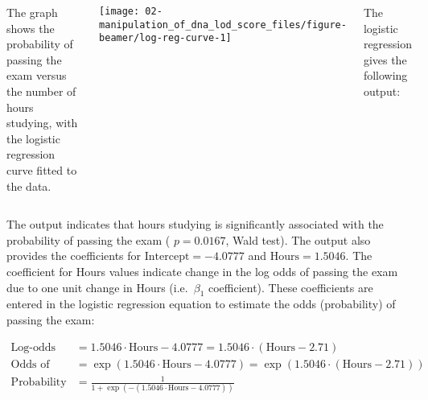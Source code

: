 \documentclass[11pt,dvipsnames,ignorenonframetext,aspectratio=169]{beamer}
\begin{document}
\begin{frame}{}
\protect\hypertarget{section-7}{}
\small

\begin{columns}[T,onlytextwidth]

The graph shows the probability of passing the exam versus the number of hours studying, with the logistic regression curve fitted to the data.


\begin{center}\texttt{[image: 02-manipulation\_of\_dna\_lod\_score\_files/figure-beamer/log-reg-curve-1]} \end{center}


The logistic regression gives the following output:

\begin{table}
\centering
{}
\end{table}

\end{columns}
\end{frame}

\begin{frame}{}
\protect\hypertarget{section-8}{}
The output indicates that hours studying is significantly associated
with the probability of passing the exam ( \({\displaystyle p=0.0167}\),
Wald test). The output also provides the coefficients for
\({\displaystyle {\text{Intercept}}=-4.0777}\) and
\({\displaystyle {\text{Hours}}=1.5046}\). The coefficient for Hours
values indicate change in the log odds of passing the exam due to one
unit change in Hours (i.e.~\(\beta_1\) coefficient). These coefficients
are entered in the logistic regression equation to estimate the odds
(probability) of passing the exam:

\[
{\displaystyle {\begin{aligned}{\text{Log-odds of passing exam}}&=1.5046\cdot {\text{Hours}}-4.0777=1.5046\cdot ({\text{Hours}}-2.71)\\{\text{Odds of passing exam}}&=\exp \left(1.5046\cdot {\text{Hours}}-4.0777\right)=\exp \left(1.5046\cdot ({\text{Hours}}-2.71)\right)\\{\text{Probability of passing exam}}&={\frac {1}{1+\exp \left(-\left(1.5046\cdot {\text{Hours}}-4.0777\right)\right)}}\end{aligned}}}
\]
\end{frame}
\end{document}
